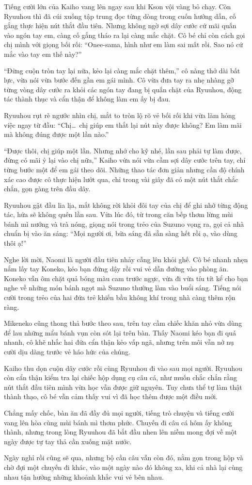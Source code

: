 ﻿\documentclass[../main.tex]{subfiles}
\begin{document}
Tiếng cười lớn của Kaiho vang lên ngay sau khi Kson vội vàng bỏ chạy. Còn Ryuuhou thì đã cúi xuống tập trung đọc từng dòng trong cuốn hướng dẫn, cố gắng thực hiện nút thắt đầu tiên. Nhưng không ngờ sợi dây cước cứ mãi quấn vào ngón tay em, càng cố gắng tháo ra lại càng mắc chặt. Cô bé chỉ còn cách gọi chị mình với giọng bối rối: ``Onee-sama, hình như em làm sai mất rồi. Sao nó cứ mắc vào tay em thế này?''

``Đừng cuộn tròn tay lại nữa, kẻo lại càng mắc chặt thêm,'' cô nàng thở dài bất lực, vừa nói vừa bước đến gần em gái mình. Cô vừa đưa tay ra nhẹ nhàng gỡ từng vòng dây cước ra khỏi các ngón tay đang bị quấn chặt của Ryuuhou, động tác thành thục và cẩn thận để không làm em ấy bị đau.

Ryuuhou rụt rè ngước nhìn chị, mắt to tròn lộ rõ vẻ bối rối khi vừa làm hỏng việc ngay từ đầu: ``Chị\dots\ chị giúp em thắt lại nút này được không? Em làm mãi mà không đúng được một lần nào.''

``Được thôi, chị giúp một lần. Nhưng nhớ cho kỹ nhé, lần sau phải tự làm được, đừng có mãi ỷ lại vào chị nữa,'' Kaiho vừa nói vừa cầm sợi dây cước trên tay, chỉ từng bước một để em gái theo dõi. Những thao tác đơn giản nhưng cần độ chính xác cao được cô thực hiện lướt qua, chỉ trong vài giây đã có một nút thắt chắc chắn, gọn gàng trên đầu dây.

Ryuuhou gật đầu lia lịa, mắt không rời khỏi đôi tay của chị để ghi nhớ từng động tác, hứa sẽ không quên lần sau. Vừa lúc đó, từ trong căn bếp thơm lừng mùi bánh mì nướng và trà nóng, giọng nói trong trẻo của Suzuno vọng ra, gọi cả nhà chuẩn bị vào ăn sáng: ``Mọi người ơi, bữa sáng đã sẵn sàng hết rồi ạ, vào dùng thôi ạ!''

Nghe lời mời, Naomi là người đầu tiên nhảy cẫng lên khỏi ghế. Cô bé nhanh nhẹn nắm lấy tay Koneko, kéo bạn đứng dậy rồi vui vẻ dẫn đường vào phòng ăn. Koneko vẫn ôm chặt quả bóng màu cam trước ngực, vừa đi vừa tíu tít kể cho bạn nghe về những món bánh ngọt mà Suzuno thường làm vào buổi sáng. Tiếng nói cười trong trẻo của hai đứa trẻ khiến bầu không khí trong nhà càng thêm rộn ràng.

Mikeneko cũng thong thả bước theo sau, trên tay cầm chiếc khăn nhỏ vừa dùng để lau những mẩu bánh vụn còn sót lại trên bàn. Thấy Naomi kéo bạn đi quá nhanh, cô khẽ nhắc hai đứa cẩn thận kẻo vấp ngã, nhưng trên môi vẫn nở nụ cười dịu dàng trước vẻ háo hức của chúng.

Kaiho thu dọn cuộn dây cước rồi cùng Ryuuhou đi vào sau mọi người. Ryuuhou còn cẩn thận kiểm tra lại chiếc hộp dụng cụ câu cá, như muốn chắc chắn rằng nút thắt đầu tiên mình vừa học vẫn được giữ nguyên. Tuy chưa thể tự làm thật thành thạo, cô bé vẫn cảm thấy vui vì đã học thêm được một điều mới.

Chẳng mấy chốc, bàn ăn đã đầy đủ mọi người, tiếng trò chuyện và tiếng cười vang lên hòa cùng mùi bánh mì thơm phức. Chuyến đi câu cá hôm ấy không thành, nhưng trong lòng Ryuuhou đã bắt đầu nhen lên niềm mong đợi về một ngày được tự tay thả cần xuống mặt nước.

Ngày nghỉ rồi cũng sẽ qua, nhưng bộ cần câu vẫn còn đó, nằm gọn trong hộp và chờ đợi một chuyến đi khác, vào một ngày nào đó không xa, khi cả nhà lại cùng nhau tận hưởng những khoảnh khắc vui vẻ bên nhau.
\end{document}
